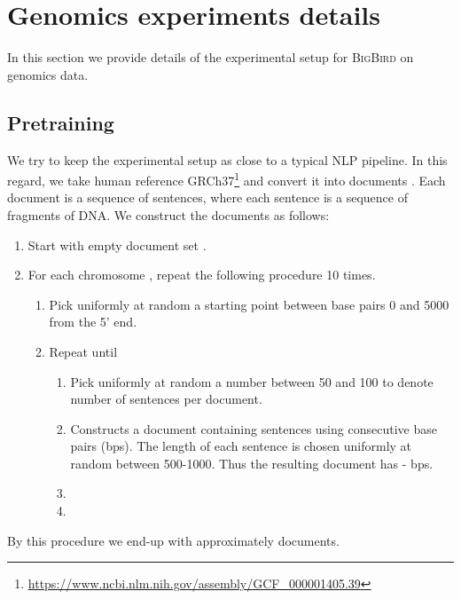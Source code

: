 \documentclass{article}
\newcommand{\bigb}{\textsc{BigBird}\xspace}
\begin{document}
\newpage
\section{Genomics experiments details}
\label{sec:apndx-expt-bio}

In this section we provide details of the experimental setup for \bigb on genomics data.

\subsection{Pretraining}
\label{sec:apndx-expt-bio:mlm}
We try to keep the experimental setup as close to a typical NLP pipeline.
In this regard, we take human reference GRCh37\footnote{\url{https://www.ncbi.nlm.nih.gov/assembly/GCF_000001405.39}} and convert it into documents . Each document  is a sequence of sentences, where each sentence is a sequence of fragments of DNA. We construct the documents as follows:
\begin{enumerate}[leftmargin=6mm, itemsep=2mm, partopsep=0pt,parsep=0pt]
    \item Start with empty document set .
    \item For each chromosome , repeat the following procedure 10 times.
    \begin{enumerate}[leftmargin=6mm, itemsep=2mm, partopsep=0pt,parsep=0pt]
         \item Pick uniformly at random a starting point  between base pairs 0 and 5000 from the 5' end.
    \item Repeat until 
    \begin{enumerate}[leftmargin=6mm, itemsep=2mm, partopsep=0pt,parsep=0pt]
    \vspace{1mm}
        \item Pick uniformly at random  a number between 50 and 100 to denote number of sentences per document.
         \item Constructs a document  containing  sentences using consecutive base pairs (bps). The length of each sentence is chosen uniformly at random between 500-1000. Thus the resulting document has  -  bps. 
        \item 
        \item 
    \end{enumerate}
\end{enumerate}
\end{enumerate}
By this procedure we end-up with approximately  documents.
\end{document}
